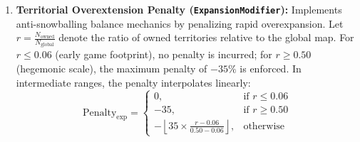\begin{enumerate}
    \item \textbf{Territorial Overextension Penalty (\texttt{ExpansionModifier}):} Implements anti-snowballing balance mechanics by penalizing rapid overexpansion. Let $r = \frac{N_{\text{owned}}}{N_{\text{global}}}$ denote the ratio of owned territories relative to the global map. For $r \le 0.06$ (early game footprint), no penalty is incurred; for $r \ge 0.50$ (hegemonic scale), the maximum penalty of $-35\%$ is enforced. In intermediate ranges, the penalty interpolates linearly:
    \begin{equation}
        \text{Penalty}_{\text{exp}} = \begin{cases}
            0, & \text{if } r \le 0.06 \\
            -35, & \text{if } r \ge 0.50 \\
            -\left\lfloor 35 \times \frac{r - 0.06}{0.50 - 0.06} \right\rfloor, & \text{otherwise}
        \end{cases}
    \end{equation}
\end{enumerate}

